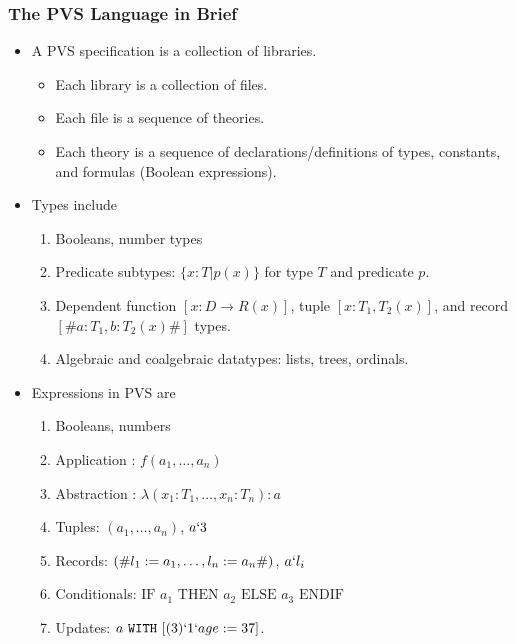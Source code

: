 \documentclass[xcolor=dvipsnames]{beamer}
\begin{document}
\begin{frame}[fragile]
\frametitle{The PVS Language in Brief}
\begin{itemize}
\item %
{\small\smaller A PVS specification is a collection of libraries.
\begin{itemize}
\item Each library is a collection of files.
  \item Each file is a sequence of theories.
    \item Each theory is a sequence of declarations/definitions of types, constants, and formulas (Boolean expressions).
    \end{itemize}
}
\item {\small\smaller Types include
\begin{enumerate}
\item Booleans, number types
\item Predicate subtypes: $\{x : T | p(x)\}  $ for type $T$ and predicate $p$. 
\item Dependent function $[x: D \rightarrow R(x)]$, tuple $[x : T_1, T_2(x)]$, and record $[\# a: T_1, b: T_2(x) \#]$ types.
\item Algebraic and coalgebraic datatypes: lists, trees, ordinals. 
\end{enumerate}
}
\item {\small\smaller Expressions in PVS are
\begin{enumerate}
\item Booleans, numbers
\item Application : $f(a_1, \ldots, a_n)$
\item Abstraction : $\lambda (x_1: T_1, \ldots, x_n: T_n): a$
\item Tuples: $(a_1, \ldots, a_n)$, $a`3$
\item Records: $({\small \#} l_1:= a_1, \ldots, l_n := a_n {\small \#})$, $a`l_i$
\item Conditionals: $\mbox{IF } {a_1} \mbox{ THEN } {a_2} \mbox{ ELSE } {a_3} \mbox{ ENDIF}$
\item Updates: $a~\mathtt{WITH}~[(3)`1`age := 37]$.    
\end{enumerate}}
\end{itemize}
\end{frame}
\end{document}
